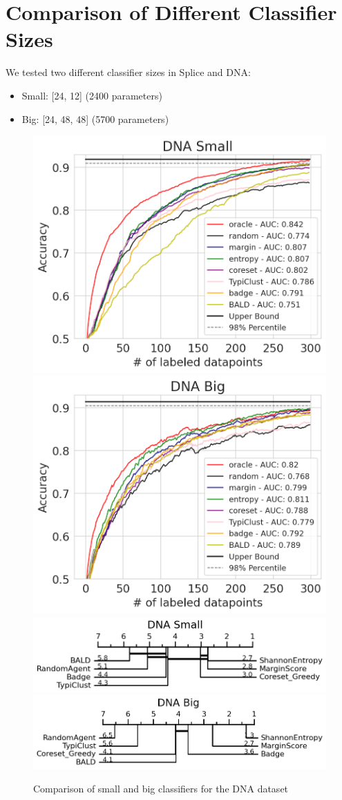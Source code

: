 \documentclass[]{article}
\begin{document}
\section{Comparison of Different Classifier Sizes}\label{app:classifier_size}
We tested two different classifier sizes in Splice and DNA:
\begin{itemize}
	\item Small: [24, 12] (2400 parameters)
	\item Big: [24, 48, 48] (5700 parameters)
\end{itemize}
\begin{figure}
	\centering
	\includegraphics[width=0.49\linewidth]{img/supp_dna_small.png}
	\includegraphics[width=0.49\linewidth]{img/supp_dna_big.png}
	\includegraphics[width=0.49\linewidth]{img/supp_micro_dna_small.png}
	\includegraphics[width=0.49\linewidth]{img/supp_micro_dna_big.png}
	\caption{Comparison of small and big classifiers for the DNA dataset}
\end{figure}
\end{document}
